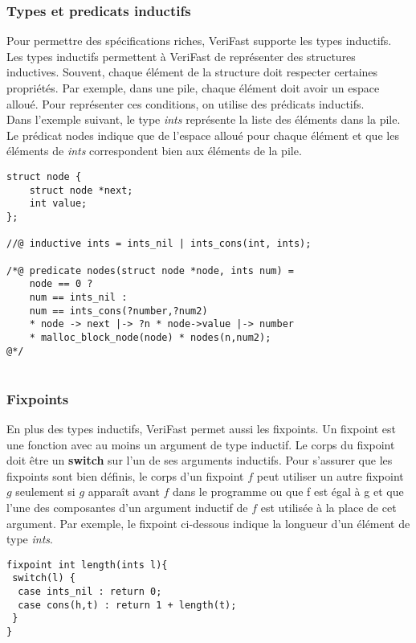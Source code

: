 \documentclass[9pt,openany]{book}
\newcommand{\verifast}{VeriFast}
\begin{document}
			\subsubsection{Types et predicats inductifs}
		
				Pour permettre des sp\'ecifications riches, \verifast{} supporte les types inductifs. Les types inductifs permettent \`a \verifast{} de repr\'esenter des structures inductives. Souvent, chaque \'el\'ement de la structure doit respecter certaines propri\'et\'es. Par exemple, dans une pile, chaque \'el\'ement doit avoir un espace allou\'e.	Pour repr\'esenter ces conditions, on utilise des pr\'edicats inductifs.\\ Dans l'exemple suivant, le type \textit{ints} repr\'esente la liste des \'el\'ements dans la pile. Le pr\'edicat nodes indique que de l'espace allou\'e pour chaque \'el\'ement et que les \'el\'ements de \textit{ints} correspondent bien aux \'el\'ements de la pile. \par
			
			\begin{lstlisting}
struct node {
	struct node *next;
	int value;
};
				
//@ inductive ints = ints_nil | ints_cons(int, ints);

/*@ predicate nodes(struct node *node, ints num) =
	node == 0 ?
	num == ints_nil :
	num == ints_cons(?number,?num2) 
	* node -> next |-> ?n * node->value |-> number
	* malloc_block_node(node) * nodes(n,num2);
@*/
	
			\end{lstlisting}			
			\subsubsection{Fixpoints}
				En plus des types inductifs, \verifast{} permet aussi les fixpoints. Un fixpoint est une fonction avec au moins un argument de type inductif. Le corps du fixpoint doit \^etre un \textbf{switch} sur l'un de ses arguments inductifs. Pour s'assurer que les fixpoints sont bien d\'efinis, le corps d'un fixpoint $f$ peut utiliser un autre fixpoint $g$ seulement si $g$ appara\^it avant $f$ dans le programme ou que f est \'egal \`a g et que l'une des composantes d'un argument inductif de $f$ est utilis\'ee \`a la place de cet argument. Par exemple, le fixpoint ci-dessous indique la longueur d'un \'el\'ement de type \textit{ints}.
			\begin{lstlisting}
fixpoint int length(ints l){
 switch(l) {
  case ints_nil : return 0;
  case cons(h,t) : return 1 + length(t);
 }
}
			\end{lstlisting}
\end{document}
